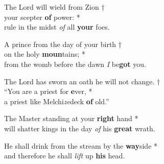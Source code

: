 The Lord will wield from Zion †\\
your scepter \textbf{of} power: *\\
rule in the midst \emph{of} all \textbf{your} foes.

A prince from the day of your birth †\\
on the holy \textbf{moun}tains; *\\
from the womb before the dawn \emph{I} be\textbf{got} you.

The Lord has sworn an oath he will not change. †\\
“You are a priest for \textbf{e}ver, *\\
a priest like Melchi\emph{ze}deck \textbf{of} old.”

The Master standing at your \textbf{right} hand *\\
will shatter kings in the day \emph{of} his \textbf{great} wrath.

He shall drink from the stream by the \textbf{way}side *\\
and therefore he shall \emph{lift} up \textbf{his} head.